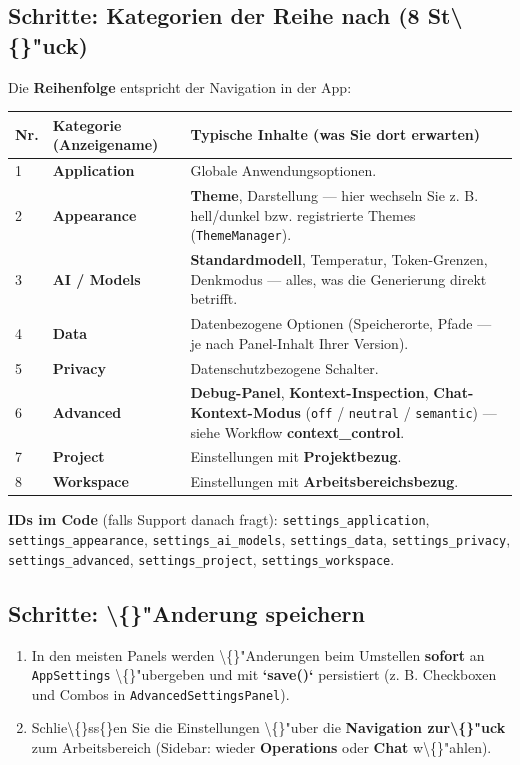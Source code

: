 \subsection{Schritte: Kategorien der Reihe nach (8 St\textbackslash\{\}"uck)}

Die \textbf{Reihenfolge} entspricht der Navigation in der App:

\begin{center}
\begin{tabular}{lll}
\hline
Nr. & Kategorie (Anzeigename) & Typische Inhalte (was Sie dort erwarten) \\
\hline
1 & \textbf{Application} & Globale Anwendungsoptionen. \\
2 & \textbf{Appearance} & \textbf{Theme}, Darstellung --- hier wechseln Sie z. B. hell/dunkel bzw. registrierte Themes (\texttt{ThemeManager}). \\
3 & \textbf{AI / Models} & \textbf{Standardmodell}, Temperatur, Token-Grenzen, Denkmodus --- alles, was die Generierung direkt betrifft. \\
4 & \textbf{Data} & Datenbezogene Optionen (Speicherorte, Pfade --- je nach Panel-Inhalt Ihrer Version). \\
5 & \textbf{Privacy} & Datenschutzbezogene Schalter. \\
6 & \textbf{Advanced} & \textbf{Debug-Panel}, \textbf{Kontext-Inspection}, \textbf{Chat-Kontext-Modus} (\texttt{off} / \texttt{neutral} / \texttt{semantic}) --- siehe Workflow \textbf{context\_control}. \\
7 & \textbf{Project} & Einstellungen mit \textbf{Projektbezug}. \\
8 & \textbf{Workspace} & Einstellungen mit \textbf{Arbeitsbereichsbezug}. \\
\hline
\end{tabular}
\end{center}

\textbf{IDs im Code} (falls Support danach fragt): \texttt{settings\_application}, \texttt{settings\_appearance}, \texttt{settings\_ai\_models}, \texttt{settings\_data}, \texttt{settings\_privacy}, \texttt{settings\_advanced}, \texttt{settings\_project}, \texttt{settings\_workspace}.

\subsection{Schritte: \textbackslash\{\}"Anderung speichern}

\begin{enumerate}
\item In den meisten Panels werden \textbackslash\{\}"Anderungen beim Umstellen \textbf{sofort} an \texttt{AppSettings} \textbackslash\{\}"ubergeben und mit \textbf{`save()`} persistiert (z. B. Checkboxen und Combos in \texttt{AdvancedSettingsPanel}).
\item Schlie\textbackslash\{\}ss\{\}en Sie die Einstellungen \textbackslash\{\}"uber die \textbf{Navigation zur\textbackslash\{\}"uck} zum Arbeitsbereich (Sidebar: wieder \textbf{Operations} oder \textbf{Chat} w\textbackslash\{\}"ahlen).
\end{enumerate}

